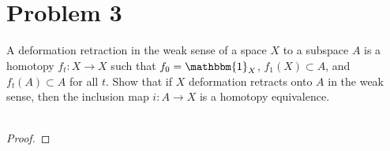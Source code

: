 \documentclass[fontsize=11pt]{scrartcl} %
\numberwithin{equation}{section} %
\numberwithin{figure}{section} %
\numberwithin{table}{section} %
\begin{document}
\newpage

\section*{Problem 3} %
A deformation retraction in the weak sense of a space $X$ to a subspace $A$ is a
homotopy $f_t:X\to X$ such that $f_0 = \mathbbm{1}_X$, $f_1(X)\subset A$, and
$f_t(A)\subset A$ for all $t$. Show that if $X$ deformation retracts onto $A$ in
the weak sense, then the inclusion map $i:A\to X$ is a homotopy equivalence.
\\
\\
\begin{proof}

\end{proof}
\end{document}
